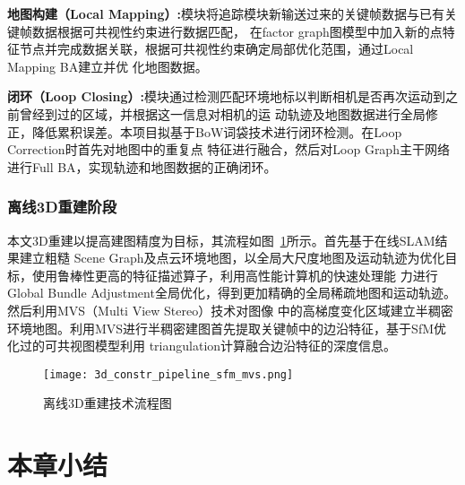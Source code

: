 \textbf{地图构建（Local Mapping）:}模块将追踪模块新输送过来的关键帧数据与已有关键帧数据根据可共视性约束进行数据匹配，
在factor graph图模型中加入新的点特征节点并完成数据关联，根据可共视性约束确定局部优化范围，通过Local Mapping BA建立并优
化地图数据。

\textbf{闭环（Loop Closing）:}模块通过检测匹配环境地标以判断相机是否再次运动到之前曾经到过的区域，并根据这一信息对相机的运
动轨迹及地图数据进行全局修正，降低累积误差。本项目拟基于BoW词袋技术进行闭环检测。在Loop Correction时首先对地图中的重复点
特征进行融合，然后对Loop Graph主干网络进行Full BA，实现轨迹和地图数据的正确闭环。
\subsubsection{离线3D重建阶段}
\label{sec:3.3.3.2}
本文3D重建以提高建图精度为目标，其流程如图~\ref{fig:3d_constr_pipeline_sfm_mvs}所示。首先基于在线SLAM结果建立粗糙
Scene Graph及点云环境地图，以全局大尺度地图及运动轨迹为优化目标，使用鲁棒性更高的特征描述算子，利用高性能计算机的快速处理能
力进行Global Bundle Adjustment全局优化，得到更加精确的全局稀疏地图和运动轨迹。然后利用MVS（Multi View Stereo）技术对图像
中的高梯度变化区域建立半稠密环境地图。利用MVS进行半稠密建图首先提取关键帧中的边沿特征，基于SfM优化过的可共视图模型利用
triangulation计算融合边沿特征的深度信息。 
\begin{figure}[H] %
  \centering
  \texttt{[image: 3d\_constr\_pipeline\_sfm\_mvs.png]}
  \caption{离线3D重建技术流程图}
  \label{fig:3d_constr_pipeline_sfm_mvs}
\end{figure}
\section{本章小结}
\label{sec:3.4}